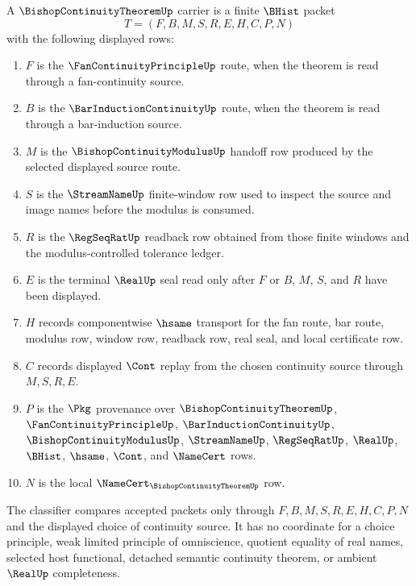 \begin{definition}
\label{def:bishop-continuity-theorem-carrier}
A $\BishopContinuityTheoremUp$ carrier is a finite $\BHist$ packet
$$
T=(F,B,M,S,R,E,H,C,P,N)
$$
with the following displayed rows:
\begin{enumerate}
\item $F$ is the $\FanContinuityPrincipleUp$ route, when the theorem is read through a fan-continuity source.
\item $B$ is the $\BarInductionContinuityUp$ route, when the theorem is read through a bar-induction source.
\item $M$ is the $\BishopContinuityModulusUp$ handoff row produced by the selected displayed source route.
\item $S$ is the $\StreamNameUp$ finite-window row used to inspect the source and image names before the modulus is consumed.
\item $R$ is the $\RegSeqRatUp$ readback row obtained from those finite windows and the modulus-controlled tolerance ledger.
\item $E$ is the terminal $\RealUp$ seal read only after $F$ or $B$, $M$, $S$, and $R$ have been displayed.
\item $H$ records componentwise $\hsame$ transport for the fan route, bar route, modulus row, window row, readback row, real seal, and local certificate row.
\item $C$ records displayed $\Cont$ replay from the chosen continuity source through $M,S,R,E$.
\item $P$ is the $\Pkg$ provenance over $\BishopContinuityTheoremUp$, $\FanContinuityPrincipleUp$, $\BarInductionContinuityUp$, $\BishopContinuityModulusUp$, $\StreamNameUp$, $\RegSeqRatUp$, $\RealUp$, $\BHist$, $\hsame$, $\Cont$, and $\NameCert$ rows.
\item $N$ is the local $\NameCert_{\BishopContinuityTheoremUp}$ row.
\end{enumerate}
The classifier compares accepted packets only through $F,B,M,S,R,E,H,C,P,N$ and the displayed choice of continuity source. It has no coordinate for a choice principle, weak limited principle of omniscience, quotient equality of real names, selected host functional, detached semantic continuity theorem, or ambient $\RealUp$ completeness.
\end{definition}

